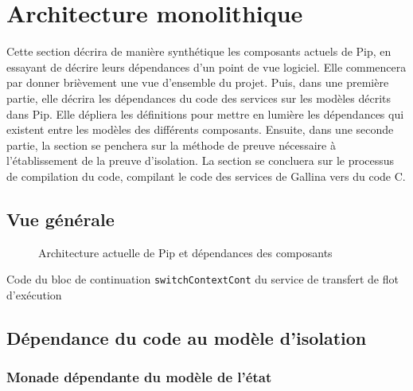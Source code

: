 	\section{Architecture monolithique}

		Cette section décrira de manière synthétique les composants actuels de Pip, en essayant de décrire leurs dépendances d'un point de vue logiciel. Elle commencera par donner brièvement une vue d'ensemble du projet. Puis, dans une première partie, elle décrira les dépendances du code des services sur les modèles décrits dans Pip. Elle dépliera les définitions pour mettre en lumière les dépendances qui existent entre les modèles des différents composants. Ensuite, dans une seconde partie, la section se penchera sur la méthode de preuve nécessaire à l'établissement de la preuve d'isolation. La section se concluera sur le processus de compilation du code, compilant le code des services de Gallina vers du code C.
		
		\subsection{Vue générale}

			\begin{figure}[!ht]
				
				\caption{Architecture actuelle de Pip et dépendances des composants}
				\label{fig:currentPipArchitecture}
			\end{figure}
			\begin{listing}[!ht]
				\caption{Code du bloc de continuation \texttt{switchContextCont} du service de transfert de flot d'exécution}
				\label{code:switchContextCont}
			\end{listing}

		\subsection{Dépendance du code au modèle d'isolation}

			\subsubsection{Monade dépendante du modèle de l'état}

